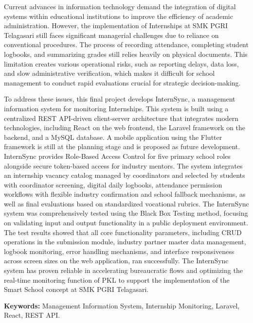 
Current advances in information technology demand the integration of digital systems within educational institutions to improve the efficiency of academic administration. However, the implementation of Internships at SMK PGRI Telagasari still faces significant managerial challenges due to reliance on conventional procedures. The process of recording attendance, completing student logbooks, and summarizing grades still relies heavily on physical documents. This limitation creates various operational risks, such as reporting delays, data loss, and slow administrative verification, which makes it difficult for school management to conduct rapid evaluations crucial for strategic decision-making.

To address these issues, this final project develops InternSync, a management information system for monitoring Internships. This system is built using a centralized REST API-driven client-server architecture that integrates modern technologies, including React on the web frontend, the Laravel framework on the backend, and a MySQL database. A mobile application using the Flutter framework is still at the planning stage and is proposed as future development. InternSync provides Role-Based Access Control for five primary school roles alongside secure token-based access for industry mentors. The system integrates an internship vacancy catalog managed by coordinators and selected by students with coordinator screening, digital daily logbooks, attendance permission workflows with flexible industry confirmation and school fallback mechanisms, as well as final evaluations based on standardized vocational rubrics. The InternSync system was comprehensively tested using the Black Box Testing method, focusing on validating input and output functionality in a public deployment environment. The test results showed that all core functionality parameters, including CRUD operations in the submission module, industry partner master data management, logbook monitoring, error handling mechanisms, and interface responsiveness across screen sizes on the web application, ran successfully. The InternSync system has proven reliable in accelerating bureaucratic flows and optimizing the real-time monitoring function of PKL to support the implementation of the Smart School concept at SMK PGRI Telagasari.

\textbf{Keywords:} Management Information System, Internship Monitoring, Laravel, React, REST API.
